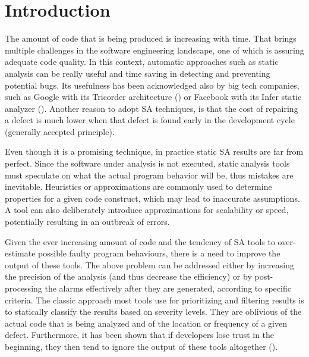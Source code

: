 
\section{Introduction}\label{sec:introduction}


The amount of code that is being produced is increasing with time. That brings multiple challenges in the software engineering landscape, one of which is assuring adequate code quality. In this context, automatic approaches such as static analysis can be really useful and time saving in detecting and preventing potential bugs. Its usefulness has been acknowledged also by big tech companies, such as Google with its Tricorder architecture (\cite{sa_google}) or Facebook with its Infer static analyzer (\cite{infer}).
Another reason to adopt SA techniques, is that the cost of repairing a defect is much lower when that defect is found early in the development cycle (generally accepted principle).

Even though it is a promising technique, in practice static SA results are far from perfect. Since the software under analysis is not executed, static analysis tools must speculate on what the actual program behavior will be, thus mistakes are inevitable. Heuristics or approximations are commonly used to determine properties for a given code construct, which may lead to inaccurate assumptions. A tool can also deliberately introduce approximations for scalability or speed, potentially resulting in an outbreak of errors.

Given the ever increasing amount of code and the tendency of SA tools to over-estimate possible faulty program behaviours, there is a need to improve the output of these tools. The above problem can be addressed either by increasing the precision of the analysis (and thus decrease the efficiency) or by post-processing the alarms effectively after they are generated, according to specific criteria.
The classic approach most tools use for prioritizing and filtering results is to statically classify the results based on severity levels. They are oblivious of the actual code that is being analyzed and of the location or frequency of a given defect. Furthermore, it has been shown that if developers lose trust in the beginning, they then tend to ignore the output of these tools altogether (\cite{sa_google}).

